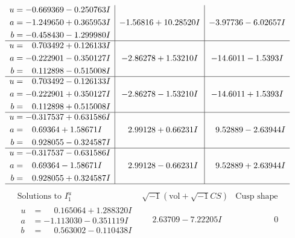 \documentclass[1p]{elsarticle_modified}
\theoremstyle{definition}
\newcommand{\I}{\sqrt{-1}}
\begin{document}
$$\begin{array}{c|c|c}
\begin{aligned}
u &= -0.669369 - 0.250763 I \\
a &= -1.249650 + 0.365953 I \\
b &= -0.458430 - 1.299980 I\end{aligned}
 & -1.56816 + 10.28520 I & -3.97736 - 6.02657 I \\ \hline\begin{aligned}
u &= \phantom{-}0.703492 + 0.126133 I \\
a &= -0.222901 - 0.350127 I \\
b &= \phantom{-}0.112898 - 0.515008 I\end{aligned}
 & -2.86278 + 1.53210 I & -14.6011 - 1.5393 I \\ \hline\begin{aligned}
u &= \phantom{-}0.703492 - 0.126133 I \\
a &= -0.222901 + 0.350127 I \\
b &= \phantom{-}0.112898 + 0.515008 I\end{aligned}
 & -2.86278 - 1.53210 I & -14.6011 + 1.5393 I \\ \hline\begin{aligned}
u &= -0.317537 + 0.631586 I \\
a &= \phantom{-}0.69364 + 1.58671 I \\
b &= \phantom{-}0.928055 - 0.324587 I\end{aligned}
 & \phantom{-}2.99128 + 0.66231 I & \phantom{-}9.52889 - 2.63944 I \\ \hline\begin{aligned}
u &= -0.317537 - 0.631586 I \\
a &= \phantom{-}0.69364 - 1.58671 I \\
b &= \phantom{-}0.928055 + 0.324587 I\end{aligned}
 & \phantom{-}2.99128 - 0.66231 I & \phantom{-}9.52889 + 2.63944 I\\
 \hline 
 \end{array}$$\newpage$$\begin{array}{c|c|c}  
\text{Solutions to }I^u_{1}& \I (\text{vol} + \sqrt{-1}CS) & \text{Cusp shape}\\
 \hline 
\begin{aligned}
u &= \phantom{-}0.165064 + 1.288320 I \\
a &= -1.113030 - 0.351119 I \\
b &= \phantom{-}0.563002 - 0.110438 I\end{aligned}
 & \phantom{-}2.63709 - 7.22205 I & \phantom{-0.000000 } 0 \\ \hline\begin{aligned}

\end{aligned}
\end{array}$$
\end{document}
